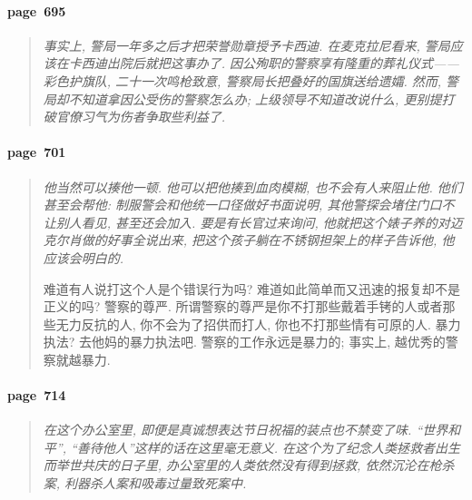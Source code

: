 \paragraph*{page~695}
\begin{quotation}
    \itshape
    事实上, 警局一年多之后才把荣誉勋章授予卡西迪. 在麦克拉尼看来, 警局应该在卡西迪出院后就把这事办了. 因公殉职的警察享有隆重的葬礼仪式------彩色护旗队, 二十一次鸣枪致意, 警察局长把叠好的国旗送给遗孀. 然而, 警局却不知道拿因公受伤的警察怎么办; 上级领导不知道改说什么, 更别提打破官僚习气为伤者争取些利益了.
\end{quotation}

\paragraph*{page~701}
\begin{quotation}
    \itshape
    他当然可以揍他一顿. 他可以把他揍到血肉模糊, 也不会有人来阻止他. 他们甚至会帮他: 制服警会和他统一口径做好书面说明, 其他警探会堵住门口不让别人看见, 甚至还会加入. 要是有长官过来询问, 他就把这个婊子养的对迈克尔肖做的好事全说出来, 把这个孩子躺在不锈钢担架上的样子告诉他, 他应该会明白的. 

    难道有人说打这个人是个错误行为吗? 难道如此简单而又迅速的报复却不是正义的吗? 警察的尊严. 所谓警察的尊严是你不打那些戴着手铐的人或者那些无力反抗的人, 你不会为了招供而打人, 你也不打那些情有可原的人. 暴力执法? 去他妈的暴力执法吧. 警察的工作永远是暴力的; 事实上, 越优秀的警察就越暴力. 
\end{quotation}

\paragraph*{page~714}
\begin{quotation}
    \itshape
    在这个办公室里, 即便是真诚想表达节日祝福的装点也不禁变了味. ``世界和平'', ``善待他人''这样的话在这里毫无意义. 在这个为了纪念人类拯救者出生而举世共庆的日子里, 办公室里的人类依然没有得到拯救, 依然沉沦在枪杀案, 利器杀人案和吸毒过量致死案中. 
\end{quotation}

